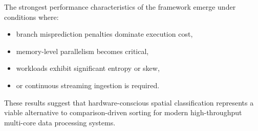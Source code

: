 The strongest performance characteristics of the framework emerge under conditions where:
\begin{itemize}
\item branch misprediction penalties dominate execution cost,
\item memory-level parallelism becomes critical,
\item workloads exhibit significant entropy or skew,
\item or continuous streaming ingestion is required.
\end{itemize}

These results suggest that hardware-conscious spatial classification represents a viable alternative to comparison-driven sorting for modern high-throughput multi-core data processing systems.
